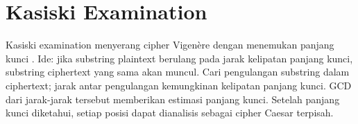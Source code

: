 \section{Kasiski Examination}

Kasiski examination menyerang cipher Vigenère dengan menemukan panjang kunci \cite{trappe2006,schneier1996}. Ide: jika substring plaintext berulang pada jarak kelipatan panjang kunci, substring ciphertext yang sama akan muncul. Cari pengulangan substring dalam ciphertext; jarak antar pengulangan kemungkinan kelipatan panjang kunci. GCD dari jarak-jarak tersebut memberikan estimasi panjang kunci. Setelah panjang kunci diketahui, setiap posisi dapat dianalisis sebagai cipher Caesar terpisah.
